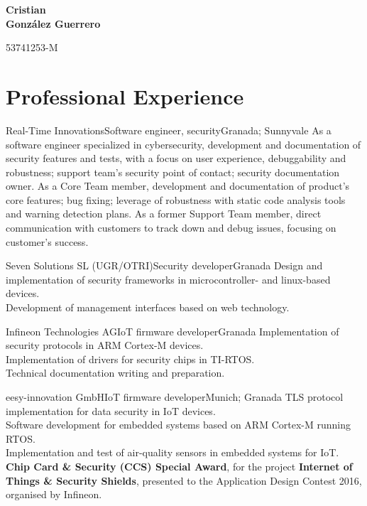 \documentclass[11pt,a4paper,sans,spanish]{moderncv}
\begin{document}
\begin{minipage}[c]{\textwidth-100pt-0.5em}
    \begin{flushright}
        \textbf{\Huge{Cristian\\\vspace{4pt}González Guerrero}}

        \vspace{4pt}
        \small{53741253-M}
    \end{flushright}
\end{minipage}
\vspace{-5em}

\makecvtitle

\section{Professional Experience}

{Real-Time Innovations}{Software engineer, security}{Granada; Sunnyvale}{}
{As a software engineer specialized in cybersecurity, development and
documentation of security features and tests, with a focus on user experience,
debuggability and robustness; support team's security point of contact;
security documentation owner.
As a Core Team member, development and documentation of product's core
features; bug fixing; leverage of robustness with static code analysis tools
and warning detection plans.
As a former Support Team member, direct communication with customers to track
down and debug issues, focusing on customer's success.
}

{Seven Solutions SL (UGR/OTRI)}{Security developer}{Granada}{}
{Design and implementation of security frameworks in microcontroller- and
linux-based devices.\\ Development of management interfaces based on web
technology.\\
}

{Infineon Technologies AG}{IoT firmware developer}{Granada}{}
{Implementation of security protocols in ARM Cortex-M devices.\\
Implementation of drivers for security chips in TI-RTOS.\\
Technical documentation writing and preparation.
}

{eesy-innovation GmbH}{IoT firmware developer}{Munich; Granada}{}
{TLS protocol implementation for data security in IoT devices.\\
Software development for embedded systems based on ARM Cortex-M running RTOS.\\
Implementation and test of air-quality sensors in embedded systems for IoT.\\
\textbf{Chip Card \& Security (CCS) Special Award}, for the project
\textbf{Internet of Things \& Security Shields}, presented to the Application
Design Contest 2016, organised by Infineon.
}
\end{document}
